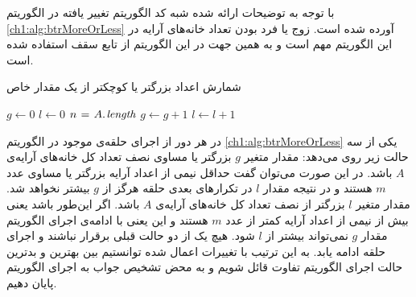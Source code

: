 {با توجه به توضیحات ارائه ‌شده شبه کد الگوریتم تغییر یافته در الگوریتم {\eqref{ch1:alg:btrMoreOrLess}} آورده شده است. زوج یا فرد بودن تعداد خانه‌های آرایه در این الگوریتم مهم است و به همین جهت در این الگوریتم از تابع سقف استفاده شده است.

\begin{algorithm}[t]
\caption{شمارش اعداد بزرگتر یا کوچکتر از یک مقدار خاص}
\label{ch1:alg:btrMoreOrLess}
\begin{latin}
\begin{algorithmic}[1]
	\State $g \gets 0$
	\State $l \gets 0$
	\State $n \mathrel{\hspace{1pt}=\hspace{1pt}} A.\hspace*{1pt}\mathit{length}$
%
					\State	$g \gets g+1$			
			\Else
					\State $l \gets l+1$
			\EndIf			
					\State \Return {}
					\State \Return {}
			\EndIf		
	\EndFor
			\State \Return {}
	\Else
			\State \Return {}
	\EndIf
\EndFunction		 	
\end{algorithmic}
\end{latin}
\end{algorithm}

 در هر دور از اجرای حلقه‌ی موجود در الگوریتم {\eqref{ch1:alg:btrMoreOrLess}} یکی از سه حالت زیر روی می‌دهد:
 مقدار متغیر {$g$} بزرگتر یا مساوی نصف تعداد کل خانه‌های آرایه‌ی {$A$} باشد. در این صورت می‌توان گفت حداقل نیمی از اعداد آرایه بزرگتر یا مساوی عدد {$m$} هستند و در نتیجه مقدار {$l$} در تکرارهای بعدی حلقه هرگز از {$g$} بیشتر نخواهد شد.
 مقدار متغیر {$l$} بزرگتر از نصف تعداد کل خانه‌های آرایه‌ی {$A$} باشد. اگر این‌طور باشد یعنی بیش از نیمی از اعداد آرایه کمتر از عدد {$m$} هستند و این یعنی با ادامه‌ی اجرای الگوریتم مقدار {$g$} نمی‌تواند بیشتر از {$l$} شود.
 هیچ یک از دو حالت قبلی برقرار نباشند و اجرای حلقه ادامه یابد.
به این ترتیب با تغییرات اعمال ‌شده توانستیم بین بهترین و بدترین حالت اجرای الگوریتم تفاوت قائل ‌شویم و به محض تشخیص جواب به اجرای الگوریتم پایان دهیم.

}
